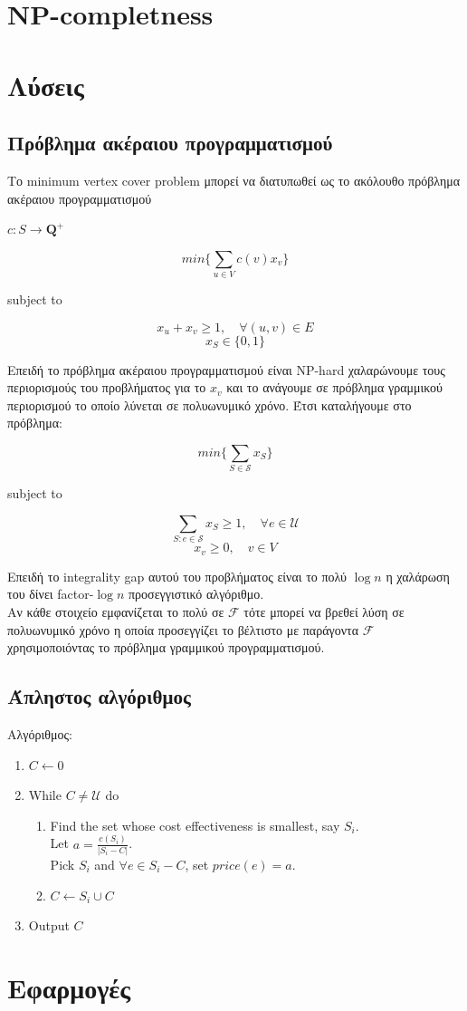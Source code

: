 \section{NP-completness}

\section{Λύσεις}

\subsection{Πρόβλημα ακέραιου προγραμματισμού}

Το minimum vertex cover problem μπορεί να διατυπωθεί ως το ακόλουθο πρόβλημα ακέραιου προγραμματισμού

$c : S \rightarrow {\boldsymbol{Q}^+}$

$$min\{\displaystyle\sum_{u\in{V}} c(v)x_v\}$$ 
\centerline{subject to}
$$x_u + x_v \geq{1}, \quad \forall (u, v) \in{E}$$
$$ x_S \in{\{0, 1\}}$$

Επειδή το πρόβλημα ακέραιου προγραμματισμού είναι NP-hard χαλαρώνουμε τους περιορισμούς του προβλήματος για το $x_v$ και το ανάγουμε σε πρόβλημα γραμμικού περιορισμού το οποίο λύνεται σε πολυωνυμικό χρόνο. Έτσι καταλήγουμε στο πρόβλημα:

$$min\{\displaystyle\sum_{S\in{\mathcal{S}}} x_S\}$$ 
\centerline{subject to}
$$\displaystyle\sum_{S:e\in{\mathcal{S}}} x_S \geq{1}, \quad \forall e \in{\mathcal{U}}$$
$$ x_v \geq 0, \quad v \in{V}$$

Επειδή το integrality gap αυτού του προβλήματος είναι το πολύ $\log{n}$ η χαλάρωση του δίνει factor-$\log{n}$ προσεγγιστικό αλγόριθμο.
\\
Αν κάθε στοιχείο εμφανίζεται το πολύ σε ${\mathcal{F}}$ τότε μπορεί να βρεθεί λύση σε πολυωνυμικό χρόνο η οποία προσεγγίζει το βέλτιστο με παράγοντα ${\mathcal{F}}$ χρησιμοποιόντας το πρόβλημα γραμμικού προγραμματισμού.

\subsection{Άπληστος αλγόριθμος} 

Αλγόριθμος:
\begin{enumerate}
\item $ C \leftarrow 0$
\item While $ C \neq {\mathcal{U}} $ do
\begin{enumerate}
\item Find the set whose cost effectiveness is smallest, say $S_i$. \\
			Let $a = \frac{c(S_i)}{|S_i-C|}$. \\
			Pick $S_i$ and $\forall e \in{S_i - C}$, set $price(e) = a$.
\item $C \leftarrow S_i \cup C$
\end{enumerate}
\item Output $C$
\end{enumerate}

\section{Εφαρμογές}
